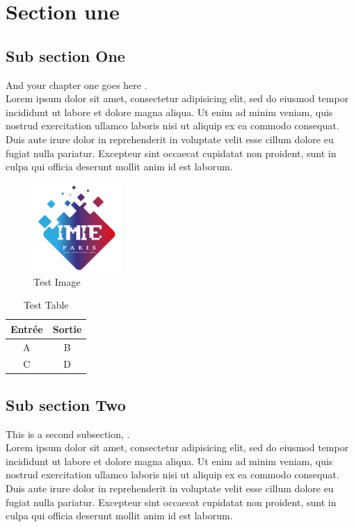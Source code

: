 
\section{Section une}
\label{chap:sectionone}

\subsection{Sub section One}

And your chapter one goes here \cite{web001,Nom2012}. \\
  Lorem ipsum dolor sit amet, consectetur adipisicing elit, sed do eiusmod
  tempor incididunt ut labore et dolore magna aliqua. Ut enim ad minim veniam, quis nostrud exercitation ullamco laboris nisi ut aliquip ex ea commodo consequat. Duis aute irure dolor in reprehenderit in voluptate velit esse \cite{Bird02nltk:the}
  cillum dolore eu fugiat nulla pariatur. Excepteur sint occaecat cupidatat non
  proident, sunt in culpa qui officia deserunt mollit anim id est laborum.

  \begin{figure}[h]%
    \center%
    \includegraphics[width=0.3\textwidth]{./images/logonoir.png}
    \caption[This is a test image]{Test Image}\label{fig:test}
  \end{figure}


\begin{table}\begin{center}
\begin{tabular}{c|c}
Entrée & Sortie \\ \hline 
A & B \\
C & D
\end{tabular}
\caption{Test Table}\end{center}
\end{table}


\subsection{Sub section Two}

  This is a second subsection\cite{gen1972}, \cite{schaeffer99}. ~\\
  Lorem ipsum dolor sit amet, consectetur adipisicing elit, sed do eiusmod
  tempor incididunt ut labore et dolore magna aliqua. Ut enim ad minim veniam,
  quis nostrud exercitation ullamco laboris nisi ut aliquip ex ea commodo
  consequat. Duis aute irure dolor in reprehenderit in voluptate velit esse
  cillum dolore eu fugiat nulla pariatur. Excepteur sint occaecat cupidatat non
  proident, sunt in culpa qui officia deserunt mollit anim id est laborum.


